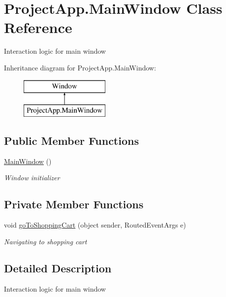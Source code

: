 \hypertarget{class_project_app_1_1_main_window}{}\section{Project\+App.\+Main\+Window Class Reference}
\label{class_project_app_1_1_main_window}


Interaction logic for main window  


Inheritance diagram for Project\+App.\+Main\+Window\+:\begin{figure}[H]
\begin{center}
\leavevmode
\includegraphics[height=2.000000cm]{class_project_app_1_1_main_window}
\end{center}
\end{figure}
\subsection*{Public Member Functions}
\begin{DoxyCompactItemize}
\item 
\mbox{\hyperlink{class_project_app_1_1_main_window_ae91410d182d0b610e1af5552c7440321}{Main\+Window}} ()
\begin{DoxyCompactList}\small\item\em Window initializer \end{DoxyCompactList}\end{DoxyCompactItemize}
\subsection*{Private Member Functions}
\begin{DoxyCompactItemize}
\item 
void \mbox{\hyperlink{class_project_app_1_1_main_window_a0cecd119e88b9d69affe8fa48210e0a5}{go\+To\+Shopping\+Cart}} (object sender, Routed\+Event\+Args e)
\begin{DoxyCompactList}\small\item\em Navigating to shopping cart \end{DoxyCompactList}\end{DoxyCompactItemize}


\subsection{Detailed Description}
Interaction logic for main window 



